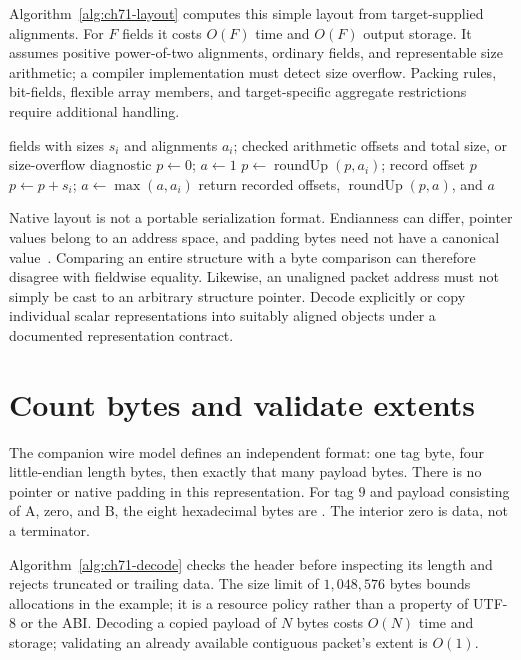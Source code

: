 Algorithm~\ref{alg:ch71-layout} computes this simple layout from target-supplied alignments.
For $F$ fields it costs $O(F)$ time and $O(F)$ output storage.
It assumes positive power-of-two alignments, ordinary fields, and representable size arithmetic; a compiler implementation must detect size overflow.
Packing rules, bit-fields, flexible array members, and target-specific aggregate restrictions require additional handling.

\begin{algorithm}[htbp]
\caption{Lay out ordinary fields using supplied target sizes and alignments.}
\label{alg:ch71-layout}
\begin{pseudocode}
\Require fields with sizes $s_i$ and alignments $a_i$; checked arithmetic
\Ensure offsets and total size, or size-overflow diagnostic
\State $p\gets0$; $a\gets1$
  \State $p\gets\operatorname{roundUp}(p,a_i)$; record offset $p$
  \State $p\gets p+s_i$; $a\gets\max(a,a_i)$
\EndFor
\State return recorded offsets, $\operatorname{roundUp}(p,a)$, and $a$
\end{pseudocode}
\end{algorithm}

Native layout is not a portable serialization format.
Endianness can differ, pointer values belong to an address space, and padding bytes need not have a canonical value~\cite{wg14-2011-c11}.
Comparing an entire structure with a byte comparison can therefore disagree with fieldwise equality.
Likewise, an unaligned packet address must not simply be cast to an arbitrary structure pointer.
Decode explicitly or copy individual scalar representations into suitably aligned objects under a documented representation contract.

\section{Count bytes and validate extents}
\label{sec:ch71-extents}
The companion wire model defines an independent format: one tag byte, four little-endian length bytes, then exactly that many payload bytes.
There is no pointer or native padding in this representation.
For tag $9$ and payload consisting of A, zero, and B, the eight hexadecimal bytes are
.
The interior zero is data, not a terminator.

Algorithm~\ref{alg:ch71-decode} checks the header before inspecting its length and rejects truncated or trailing data.
The size limit of $1{,}048{,}576$ bytes bounds allocations in the example; it is a resource policy rather than a property of UTF-8 or the ABI.
Decoding a copied payload of $N$ bytes costs $O(N)$ time and storage; validating an already available contiguous packet's extent is $O(1)$.


